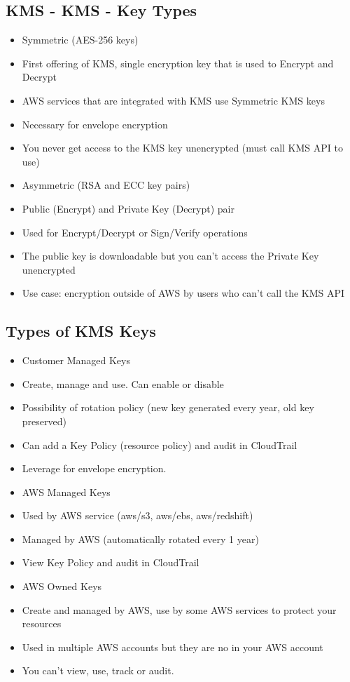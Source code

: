 \subsection{KMS - KMS - Key Types}
\begin{itemize}
    \item Symmetric (AES-256 keys)
    \item First offering of KMS, single encryption key that is used to Encrypt and Decrypt
    \item AWS services that are integrated with KMS use Symmetric KMS keys
    \item Necessary for envelope encryption
    \item You never get access to the KMS key unencrypted (must call KMS API to use)
    \item Asymmetric (RSA and ECC key pairs)
    \item Public (Encrypt) and Private Key (Decrypt) pair
    \item Used for Encrypt/Decrypt or Sign/Verify operations
    \item The public key is downloadable but you can't access the Private Key unencrypted
    \item Use case: encryption outside of AWS by users who can't call the KMS API
\end{itemize}

\subsection{Types of KMS Keys}
\begin{itemize}
    \item Customer Managed Keys
    \item Create, manage and use. Can enable or disable
    \item Possibility of rotation policy (new key generated every year, old key preserved)
    \item Can add a Key Policy (resource policy) and audit in CloudTrail
    \item Leverage for envelope encryption.
    \item AWS Managed Keys
    \item Used by AWS service (aws/s3, aws/ebs, aws/redshift)
    \item Managed by AWS (automatically rotated every 1 year)
    \item View Key Policy and audit in CloudTrail
    \item AWS Owned Keys
    \item Create and managed by AWS, use by some AWS services to protect your resources
    \item Used in multiple AWS accounts but they are no in your AWS account
    \item You can't view, use, track or audit.
\end{itemize}

